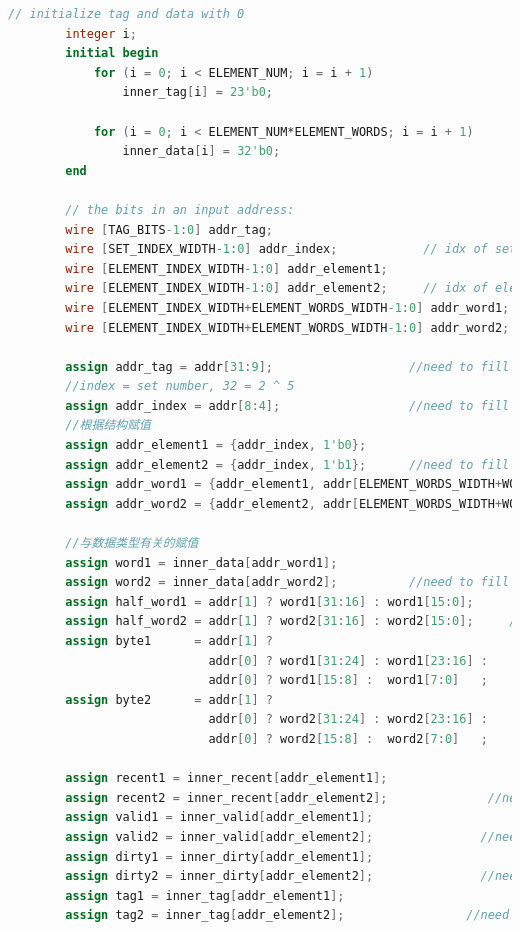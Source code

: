 \begin{lstlisting}[language = {verilog}]
        // initialize tag and data with 0
        integer i;
        initial begin
            for (i = 0; i < ELEMENT_NUM; i = i + 1)
                inner_tag[i] = 23'b0;
    
            for (i = 0; i < ELEMENT_NUM*ELEMENT_WORDS; i = i + 1)
                inner_data[i] = 32'b0;
        end
    
        // the bits in an input address:
        wire [TAG_BITS-1:0] addr_tag;
        wire [SET_INDEX_WIDTH-1:0] addr_index;            // idx of set
        wire [ELEMENT_INDEX_WIDTH-1:0] addr_element1; 
        wire [ELEMENT_INDEX_WIDTH-1:0] addr_element2;     // idx of element
        wire [ELEMENT_INDEX_WIDTH+ELEMENT_WORDS_WIDTH-1:0] addr_word1;
        wire [ELEMENT_INDEX_WIDTH+ELEMENT_WORDS_WIDTH-1:0] addr_word2; // element index + word index
    
        assign addr_tag = addr[31:9];                   //need to fill in
        //index = set number, 32 = 2 ^ 5
        assign addr_index = addr[8:4];                  //need to fill in
        //根据结构赋值
        assign addr_element1 = {addr_index, 1'b0};
        assign addr_element2 = {addr_index, 1'b1};      //need to fill in
        assign addr_word1 = {addr_element1, addr[ELEMENT_WORDS_WIDTH+WORD_BYTES_WIDTH-1:WORD_BYTES_WIDTH]};
        assign addr_word2 = {addr_element2, addr[ELEMENT_WORDS_WIDTH+WORD_BYTES_WIDTH-1:WORD_BYTES_WIDTH]};           //need to fill in
    
        //与数据类型有关的赋值
        assign word1 = inner_data[addr_word1];
        assign word2 = inner_data[addr_word2];          //need to fill in
        assign half_word1 = addr[1] ? word1[31:16] : word1[15:0];
        assign half_word2 = addr[1] ? word2[31:16] : word2[15:0];     //need to fill in
        assign byte1      = addr[1] ?
                            addr[0] ? word1[31:24] : word1[23:16] :
                            addr[0] ? word1[15:8] :  word1[7:0]   ;
        assign byte2      = addr[1] ?
                            addr[0] ? word2[31:24] : word2[23:16] :
                            addr[0] ? word2[15:8] :  word2[7:0]   ;               //need to fill in
    
        assign recent1 = inner_recent[addr_element1];
        assign recent2 = inner_recent[addr_element2];              //need to fill in
        assign valid1 = inner_valid[addr_element1];
        assign valid2 = inner_valid[addr_element2];               //need to fill in
        assign dirty1 = inner_dirty[addr_element1];
        assign dirty2 = inner_dirty[addr_element2];               //need to fill in
        assign tag1 = inner_tag[addr_element1];
        assign tag2 = inner_tag[addr_element2];                 //need to fill in
    

\end{lstlisting}
